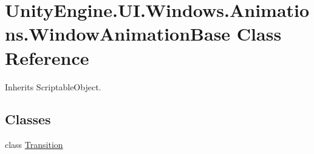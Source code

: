 \hypertarget{class_unity_engine_1_1_u_i_1_1_windows_1_1_animations_1_1_window_animation_base}{}\section{Unity\+Engine.\+U\+I.\+Windows.\+Animations.\+Window\+Animation\+Base Class Reference}
\label{class_unity_engine_1_1_u_i_1_1_windows_1_1_animations_1_1_window_animation_base}


Inherits Scriptable\+Object.

\subsection*{Classes}
\begin{DoxyCompactItemize}
\item 
class \hyperlink{class_unity_engine_1_1_u_i_1_1_windows_1_1_animations_1_1_window_animation_base_1_1_transition}{Transition}
\end{DoxyCompactItemize}

